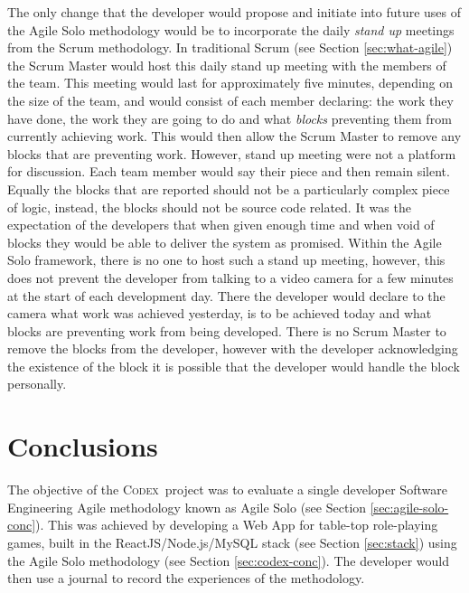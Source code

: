 \documentclass[final]{cmpreport}
\newcommand{\Codex}{\textsc{Codex}}
\begin{document}
		The only change that the developer would propose and initiate into future uses of the Agile Solo methodology would be to incorporate the daily \emph{stand up} meetings from the Scrum methodology. In traditional Scrum (see Section \ref{sec:what-agile}) the Scrum Master would host this daily stand up meeting with the members of the team. This meeting would last for approximately five minutes, depending on the size of the team, and would consist of each member declaring: the work they have done, the work they are going to do and what \emph{blocks} preventing them from currently achieving work. This would then allow the Scrum Master to remove any blocks that are preventing work. However, stand up meeting were not a platform for discussion. Each team member would say their piece and then remain silent. Equally the blocks that are reported should not be a particularly complex piece of logic, instead, the blocks should not be source code related. It was the expectation of the developers that when given enough time and when void of blocks they would be able to deliver the system as promised. Within the Agile Solo framework, there is no one to host such a stand up meeting, however, this does not prevent the developer from talking to a video camera for a few minutes at the start of each development day. There the developer would declare to the camera what work was achieved yesterday, is to be achieved today and what blocks are preventing work from being developed. There is no Scrum Master to remove the blocks from the developer, however with the developer acknowledging the existence of the block it is possible that the developer would handle the block personally. 
			
	\section{Conclusions} \label{sec:conclusions}
	The objective of the \Codex \ project was to evaluate a single developer Software Engineering Agile methodology known as Agile Solo (see Section \ref{sec:agile-solo-conc}). This was achieved by developing a Web App for table-top role-playing games, built in the ReactJS/Node.js/MySQL stack (see Section \ref{sec:stack}) using the Agile Solo methodology (see Section \ref{sec:codex-conc}). The developer would then use a journal to record the experiences of the methodology. 
	
\end{document}
